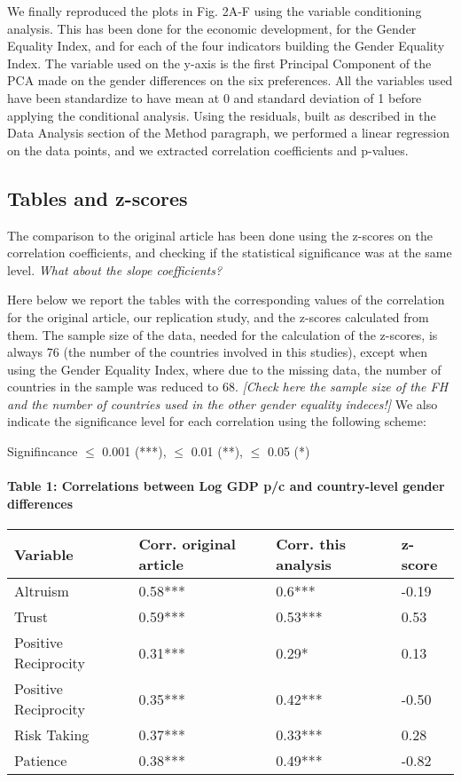 \documentclass[
  11pt,
]{article}
\begin{document}
We finally reproduced the plots in Fig. 2A-F using the variable
conditioning analysis. This has been done for the economic development,
for the Gender Equality Index, and for each of the four indicators
building the Gender Equality Index. The variable used on the y-axis is
the first Principal Component of the PCA made on the gender differences
on the six preferences. All the variables used have been standardize to
have mean at 0 and standard deviation of 1 before applying the
conditional analysis. Using the residuals, built as described in the
Data Analysis section of the Method paragraph, we performed a linear
regression on the data points, and we extracted correlation coefficients
and p-values.

\hypertarget{tables-and-z-scores}{%
\subsection{Tables and z-scores}\label{tables-and-z-scores}}

The comparison to the original article has been done using the z-scores
on the correlation coefficients, and checking if the statistical
significance was at the same level. \emph{What about the slope
coefficients?}

Here below we report the tables with the corresponding values of the
correlation for the original article, our replication study, and the
z-scores calculated from them. The sample size of the data, needed for
the calculation of the z-scores, is always 76 (the number of the
countries involved in this studies), except when using the Gender
Equality Index, where due to the missing data, the number of countries
in the sample was reduced to 68. \emph{{[}Check here the sample size of
the FH and the number of countries used in the other gender equality
indeces!{]}} We also indicate the significance level for each
correlation using the following scheme:

Signifincance \(\le\) 0.001 (***), \(\le\) 0.01 (**), \(\le\) 0.05 (*)

\hypertarget{table-1-correlations-between-log-gdp-pc-and-country-level-gender-differences}{%
\paragraph{Table 1: Correlations between Log GDP p/c and country-level
gender
differences}\label{table-1-correlations-between-log-gdp-pc-and-country-level-gender-differences}}

\begin{longtable}[]{@{}llll@{}}
\toprule
Variable & Corr. original article & Corr. this analysis &
z-score\tabularnewline
\midrule
\endhead
Altruism & 0.58*** & 0.6*** & -0.19\tabularnewline
Trust & 0.59*** & 0.53*** & 0.53\tabularnewline
Positive Reciprocity & 0.31*** & 0.29* & 0.13\tabularnewline
Positive Reciprocity & 0.35*** & 0.42*** & -0.50\tabularnewline
Risk Taking & 0.37*** & 0.33*** & 0.28\tabularnewline
Patience & 0.38*** & 0.49*** & -0.82\tabularnewline
\bottomrule
\end{longtable}
\end{document}
